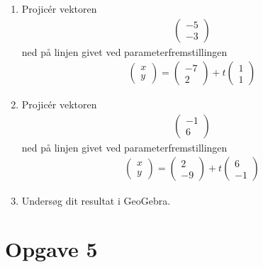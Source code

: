 \begin{enumerate}[label=\roman*)]
	\item Projicér vektoren 
	\begin{align*}
		\begin{pmatrix}
			-5 \\ -3
		\end{pmatrix}
	\end{align*}
	ned på linjen givet ved parameterfremstillingen
	\begin{align*}
		\begin{pmatrix}
			x \\ y
		\end{pmatrix} = 
		\begin{pmatrix}
			-7 \\ 2
		\end{pmatrix} + t
		\begin{pmatrix}
			1 \\ 1
		\end{pmatrix}
	\end{align*}
	\item Projicér vektoren 
	\begin{align*}
		\begin{pmatrix}
			-1 \\ 6
		\end{pmatrix}
	\end{align*}
	ned på linjen givet ved parameterfremstillingen
	\begin{align*}
		\begin{pmatrix}
			x \\ y
		\end{pmatrix} = 
		\begin{pmatrix}
			2 \\ -9
		\end{pmatrix} + t
		\begin{pmatrix}
			6 \\ -1
		\end{pmatrix}
	\end{align*}
	\item Undersøg dit resultat i GeoGebra.
\end{enumerate}

\section*{Opgave 5}

